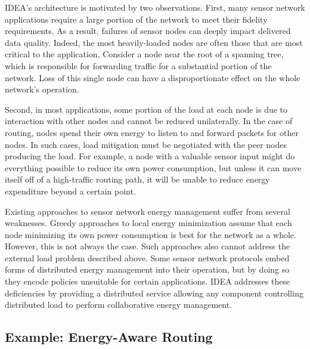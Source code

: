 \documentclass{sig-alternate}
\begin{document}
IDEA's architecture is motivated by two observations. First, many sensor
network applications require a large portion of the network to meet their
fidelity requirements. As a result, failures of sensor nodes can deeply
impact delivered data quality. Indeed, the most heavily-loaded nodes are
often those that are most critical to the application. Consider a node near
the root of a spanning tree, which is responsible for forwarding traffic for
a substantial portion of the network. Loss of this single node can have a
disproportionate effect on the whole network's operation.
\vfill\eject

Second, in most applications, some portion of the load at each node is due to
interaction with other nodes and cannot be reduced unilaterally. In the case
of routing, nodes spend their own energy to listen to and forward packets for
other nodes. In such cases, load mitigation must be negotiated with the peer
nodes producing the load. For example, a node with a valuable sensor input
might do everything possible to reduce its own power consumption, but unless
it can move itself off of a high-traffic routing path, it will be unable to
reduce energy expenditure beyond a certain point.

Existing approaches to sensor network energy management suffer from several
weaknesses. Greedy approaches to local energy minimization assume that each
node minimizing its own power consumption is best for the network as a whole.
However, this is not always the case. Such approaches also cannot address the
external load problem described above. Some sensor network protocols embed
forms of distributed energy management into their operation, but by doing so
they encode policies unsuitable for certain applications. IDEA addresses
these deficiencies by providing a distributed service allowing any component
controlling distributed load to perform collaborative energy management.

\subsection{Example: Energy-Aware Routing}
\end{document}

